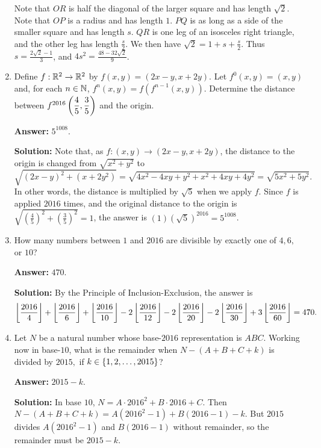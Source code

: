 \documentclass[11pt,paper=letter]{scrartcl}
\begin{document}
\begin{enumerate}[left=0pt]
Note that $OR$ is half the diagonal of the larger square and has length $\sqrt{2}$. Note that $OP$ is a radius and has length $1$. $PQ$ is as long as a side of the smaller square and has length $s$. $QR$ is one leg of an isosceles right triangle, and the other leg has length $\frac{s}{2}$. We then have $\sqrt{2} = 1 + s + \frac{s}{2}$. Thus $s = \frac{2\sqrt{2} - 1}{3}$, and $4s^2 = \frac{48 - 32\sqrt{2}}{9}$.

\item Define $f: \mathbb R^2 \rightarrow \mathbb R^2$ by $f(x, y) = (2x - y, x + 2y)$. Let $f^0(x, y) = (x, y)$ and, for each $n \in \mathbb N$, $f^n(x, y) = f(f^{n-1}(x, y))$. Determine the distance between $f^{2016}\left( \dfrac{4}{5}, \dfrac{3}{5} \right)$ and the origin.

\textbf{Answer:} $\boxed{5^{1008}}$.

\textbf{Solution:} Note that, as $f: (x, y) \rightarrow (2x - y, x + 2y)$, the distance to the origin is changed from $\sqrt{x^2 + y^2}$ to $$\sqrt{(2x - y)^2 + (x + 2y^2)} = \sqrt{4x^2 - 4xy + y^2 + x^2 + 4xy + 4y^2} = \sqrt{5x^2 + 5y^2}.$$ In other words, the distance is multiplied by $\sqrt{5}$ when we apply $f$. Since $f$ is applied $2016$ times, and the original distance to the origin is $\sqrt{(\frac{4}{5})^2 + (\frac{3}{5})^2} = 1$, the answer is $(1)(\sqrt{5})^{2016} = 5^{1008}$.

\item How many numbers between $1$ and $2016$ are divisible by exactly one of $4, 6,$ or $10$?

\textbf{Answer:} $\boxed{470}$.

\textbf{Solution:} By the Principle of Inclusion-Exclusion, the answer is $$\left\lfloor \frac{2016}{4} \right\rfloor + \left\lfloor \frac{2016}{6} \right\rfloor + \left\lfloor \frac{2016}{10} \right\rfloor - 2\left\lfloor \frac{2016}{12} \right\rfloor - 2\left\lfloor \frac{2016}{20} \right\rfloor - 2\left\lfloor \frac{2016}{30} \right\rfloor + 3\left\lfloor \frac{2016}{60} \right\rfloor = 470.$$

\item Let $N$ be a natural number whose base-$2016$ representation is $ABC$. Working now in base-$10$, what is the remainder when $N - (A + B + C + k)$ is divided by $2015,$ if $k \in \left\{ 1, 2, \ldots, 2015 \right\}$?

\textbf{Answer:} $\boxed{2015 - k}$.

\textbf{Solution:} In base $10$, $N = A \cdot 2016^2 + B \cdot 2016 + C$. Then $N - (A + B + C + k) = A(2016^2 - 1) + B(2016 - 1) - k$. But $2015$ divides $A(2016^2 - 1)$ and $B(2016 - 1)$ without remainder, so the remainder must be $2015 - k$.


\end{enumerate}
\end{document}
